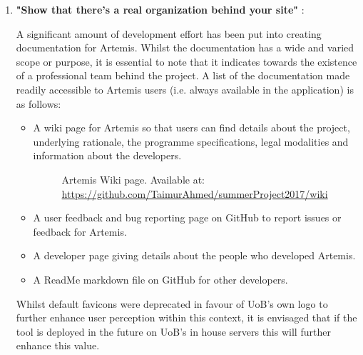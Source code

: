 \begin{enumerate}
    \newpage
    \item \textbf{"Show that there's a real organization behind your site"} \cite{Fogg2002a}:
    
    A significant amount of development effort has been put into creating documentation for Artemis. Whilst the documentation has a wide and varied scope or purpose, it is essential to note that it indicates towards the existence of a professional team behind the project. A list of the documentation made readily accessible to Artemis users (i.e. always available in the application) is as follows:
    
    \begin{itemize}
        \item A wiki page for Artemis so that users can find details about the project, underlying rationale, the programme specifications, legal modalities and information about the developers.
            \begin{figure}[H]
                \caption{Artemis Wiki page. Available at: \url{https://github.com/TaimurAhmed/summerProject2017/wiki}}
            \end{figure}
        \item A user feedback and bug reporting page on GitHub to report issues or feedback for Artemis.
        \item A developer page giving details about the people who developed Artemis.
        \item A ReadMe markdown file on GitHub for other developers.
    \end{itemize}
    
    Whilst default favicons were deprecated in favour of UoB's own logo \cite{UniversityofBristola} to further enhance user perception within this context, it is envisaged that if the tool is deployed in the future on UoB's in house servers this will further enhance this value.
            

\end{enumerate}
